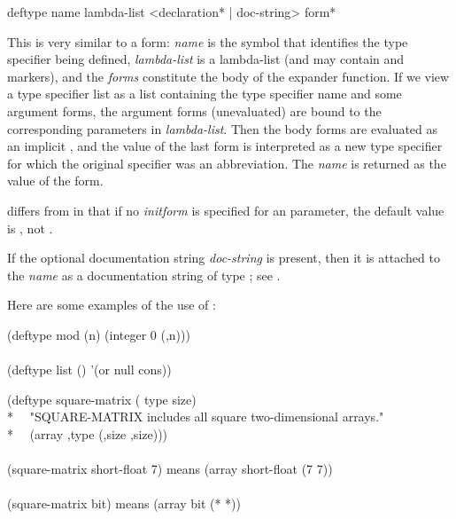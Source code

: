 \begin{defmac}
deftype name lambda-list <{declaration}* | doc-string> {form}*

This is very similar to a  form: \emph{name} is the
symbol that identifies the type specifier being defined, \emph{lambda-list} is
a lambda-list (and may contain  and 
markers), and
the \emph{forms} constitute the body of the expander function.  If we view a
type specifier list as a list containing the type specifier name and some argument forms,
the argument forms (unevaluated) are bound to the corresponding
parameters in \emph{lambda-list}.  Then the body forms are evaluated
as an implicit , and the value of the last form
is interpreted as a new type specifier for which the original specifier
was an abbreviation.  The \emph{name} is returned as the value of the
 form.

 differs from  in that if no \emph{initform}
is specified for an  parameter, the default value
is \cd{*}, not {\nil}.

If the optional documentation string \emph{doc-string} is present,
then it is attached to the \emph{name}
as a documentation string of type ; see .

Here are some examples of the use of :
\begin{lisp}
(deftype mod (n) {\Xbq}(integer 0 (,n))) \\
 \\
(deftype list () '(or null cons))
\end{lisp}


\begin{lisp}
(deftype square-matrix ( type size) \\*
~~"SQUARE-MATRIX includes all square two-dimensional arrays." \\*
~~{\Xbq}(array ,type (,size ,size))) \\
 \\
(square-matrix short-float 7)  \textrm{means}  (array short-float (7 7)) \\
 \\
(square-matrix bit)  \textrm{means}  (array bit (* *))
\end{lisp}


\end{defmac}
